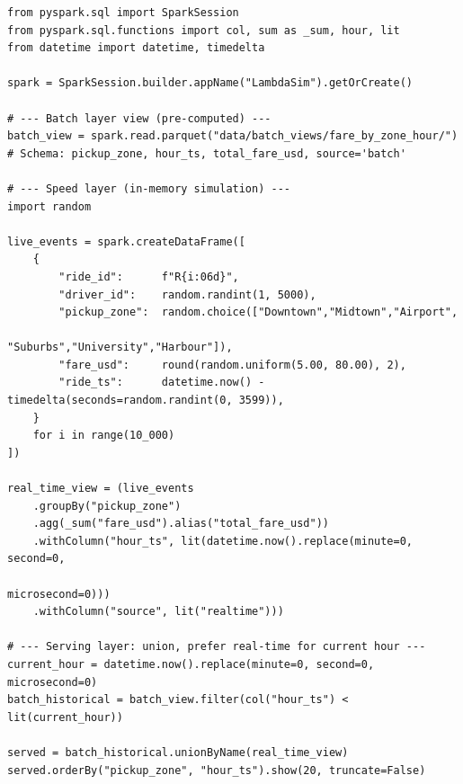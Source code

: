 \begin{lstlisting}[style=pyspark, caption={PE8.2: Lambda serving layer union in PySpark}]
from pyspark.sql import SparkSession
from pyspark.sql.functions import col, sum as _sum, hour, lit
from datetime import datetime, timedelta

spark = SparkSession.builder.appName("LambdaSim").getOrCreate()

# --- Batch layer view (pre-computed) ---
batch_view = spark.read.parquet("data/batch_views/fare_by_zone_hour/")
# Schema: pickup_zone, hour_ts, total_fare_usd, source='batch'

# --- Speed layer (in-memory simulation) ---
import random

live_events = spark.createDataFrame([
    {
        "ride_id":      f"R{i:06d}",
        "driver_id":    random.randint(1, 5000),
        "pickup_zone":  random.choice(["Downtown","Midtown","Airport",
                                       "Suburbs","University","Harbour"]),
        "fare_usd":     round(random.uniform(5.00, 80.00), 2),
        "ride_ts":      datetime.now() - timedelta(seconds=random.randint(0, 3599)),
    }
    for i in range(10_000)
])

real_time_view = (live_events
    .groupBy("pickup_zone")
    .agg(_sum("fare_usd").alias("total_fare_usd"))
    .withColumn("hour_ts", lit(datetime.now().replace(minute=0, second=0,
                                                       microsecond=0)))
    .withColumn("source", lit("realtime")))

# --- Serving layer: union, prefer real-time for current hour ---
current_hour = datetime.now().replace(minute=0, second=0, microsecond=0)
batch_historical = batch_view.filter(col("hour_ts") < lit(current_hour))

served = batch_historical.unionByName(real_time_view)
served.orderBy("pickup_zone", "hour_ts").show(20, truncate=False)
\end{lstlisting}

